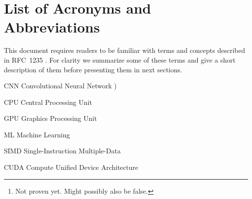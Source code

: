 \documentclass[12pt,twoside]{article}
\begin{document}
\maketitle


\begin{abstract}
\label{sec:abstract}

We compare 4 dynamic memory allocators designed for running on GPUs and select the best performing under TensorFlow’s Convolutional Neural Network (CNN) benchmark, running only the ResNet-50 model. Our main metric of comparison is the number of images per second processed by the benchmark. Other metrics studied are: object sizes requested for allocation by the benchmark and the frequency in allocation request and in the sizes used. After our performance analysis, we conclude that \texttt{Halloc} algorithm is better than the already used algorithms by TensorFlow, \texttt{CUDAMalloc} and \texttt{BFCMalloc}, in the context of the benchmark itself.\footnote{Not proven yet. Might possibly also be false.}.

\textbf{Keywords:} Algorithm, Performance, Machine learning, GPU, Dynamic memory, Allocation, TensorFlow

\end{abstract}

\tableofcontents

\section*{List of Acronyms and Abbreviations}
\label{list-of-acronyms-and-abbreviations}

This document requires readers to be familiar with terms and concepts described in \mbox{RFC~1235} \cite{john_ioannidis_coherent_1991}. For clarity we summarize some of these terms and give a short description of them before presenting them in next sections.

\begin{basedescript}{\desclabelstyle{\pushlabel}\desclabelwidth{10em}}
\item[CNN]					Convolutional Neural Network \cite{postel_internet_1981})
\item[CPU]                  Central Processing Unit
\item[GPU]                  Graphics Processing Unit
\item[ML]                   Machine Learning
\item[SIMD]                 Single-Instruction Multiple-Data
\item[CUDA]                 Compute Unified Device Architecture
\end{basedescript}
\end{document}
